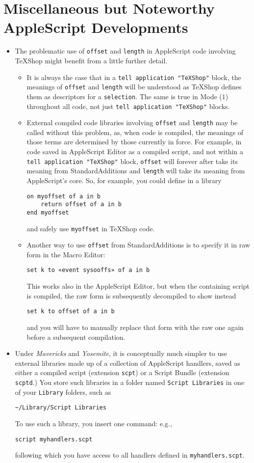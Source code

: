 \documentclass[11pt]{amsart}
\def\TeXShop{\TeX Shop\xspace}
\begin{document}
\section{Miscellaneous but Noteworthy AppleScript Developments}
\begin{itemize}
\item The problematic use of {\tt offset} and {\tt length} in AppleScript code involving \TeXShop might benefit from a little further detail. 
\begin{itemize}
\item
It is always the case that in a \verb|tell application "TeXShop"| block, the meanings of {\tt offset} and {\tt length} will be understood as \TeXShop defines them as descriptors for a {\tt selection}. The same is true in Mode ($1$) throughout all code, not just \verb|tell application "TeXShop"| blocks.
\item External compiled code libraries involving {\tt offset} and {\tt length} may be called without this problem, as, when code is compiled, the meanings of those terms are determined by those currently in force. For example, in code saved in \textsf{AppleScript Editor} as a compiled script, and not within a \verb|tell application "TeXShop"| block, {\tt offset} will forever after take its meaning from \textsf{StandardAdditions} and {\tt length} will take its meaning from AppleScript's core. So, for example, you could define in a library
\begin{verbatim}
on myoffset of a in b
    return offset of a in b
end myoffset
\end{verbatim}
and safely use {\tt myoffset} in \TeXShop code.
\item Another way to use {\tt offset} from \textsf{StandardAdditions} is to specify it in raw form in the \textsf{Macro Editor}:
\begin{verbatim}
set k to «event sysooffs» of a in b 
\end{verbatim}
This works also in the \textsf{AppleScript Editor}, but when the containing script is compiled, the raw form is subsequently decompiled to show instead
\begin{verbatim}
set k to offset of a in b 
\end{verbatim}
and you will have to manually replace that form with the raw one again before a subsequent compilation.
\end{itemize}
\item Under \emph{Mavericks} and \emph{Yosemite}, it is conceptually much simpler to  use external libraries made up of a collection of AppleScript handlers, saved as either a compiled script (extension {\tt scpt}) or a Script Bundle (extension {\tt scptd}.) You store such libraries in a folder named {\tt Script Libraries} in one of your {\tt Library} folders, such as
\begin{verbatim}
~/Library/Script Libraries
\end{verbatim}
To use such a library, you insert one  command: e.g.,
\begin{verbatim}
script myhandlers.scpt
\end{verbatim}
following which you have access to all handlers defined in {\tt myhandlers.scpt}.


\end{itemize}
\end{document}
